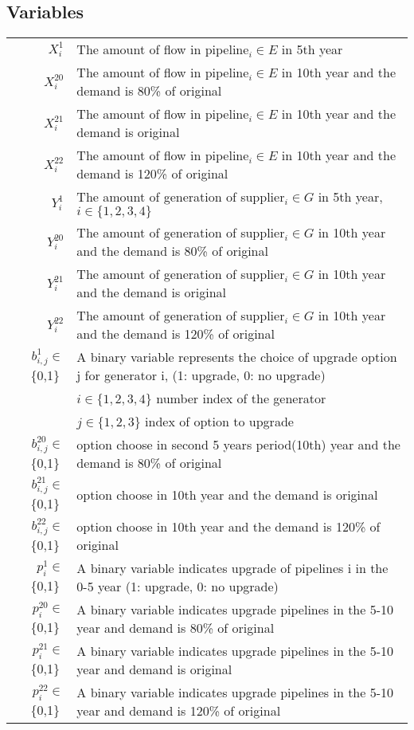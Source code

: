 \documentclass{article}
\begin{document}
	

	\subsection*{Variables}
	
	\begin{tabular}{rl}
		$X^1_{i} $ &  The amount of flow in pipeline$_i\in E$ in 5th year \\
		$X^{20}_{i} $ &  The amount of flow in pipeline$_i\in E$ in 10th year and the demand is 80\% of original\\
		$X^{21}_{i} $ &  The amount of flow in pipeline$_i\in E$ in 10th year and the demand is original\\
		$X^{22}_{i} $ &  The amount of flow in pipeline$_i\in E$ in 10th year and the demand is 120\% of original\\
		$Y^1_{i} $ &  The amount of generation of supplier$_i\in G$ in 5th year, $i\in \{1,2,3,4\}$ \\
		$Y^{20}_{i} $ &  The amount of generation of supplier$_i\in G$ in 10th year and the demand is 80\% of original \\
		$Y^{21}_{i} $ &  The amount of generation of supplier$_i\in G$ in 10th year and the demand is original \\
		$Y^{22}_{i} $ &  The amount of generation of supplier$_i\in G$ in 10th year and the demand is 120\% of original\\
		$b^1_{i,j} \in $ \{0,1\}  $ $ & A binary variable represents the choice of upgrade option j for generator i, (1: upgrade, 0: no upgrade)\\
		&$i\in\{1,2,3,4\}$ number index of the generator\\
		&$j\in\{1,2,3\}$ index of option to upgrade\\
		$b^{20}_{i,j} \in $ \{0,1\}  $ $ & option choose in second 5 years period(10th) year and the demand is 80\% of original\\
		$b^{21}_{i,j} \in $ \{0,1\}  $ $ & option choose in 10th year and the demand is original\\
		$b^{22}_{i,j} \in $ \{0,1\}  $ $ & option choose in 10th year and the demand is 120\% of original\\

		$p^1_i \in $ \{0,1\}  $ $ &  A binary variable indicates upgrade of pipelines i in the 0-5 year (1: upgrade, 0: no upgrade)\\
		$p^{20}_i \in $ \{0,1\}  $ $ &  A binary variable indicates upgrade pipelines in the 5-10 year and demand is 80\% of original \\
		$p^{21}_i \in $ \{0,1\}  $ $ &  A binary variable indicates upgrade pipelines in the 5-10 year and demand is original \\
		$p^{22}_i \in $ \{0,1\}  $ $ &  A binary variable indicates upgrade pipelines in the 5-10 year and demand is 120\% of original\\

	\end{tabular}
	
\end{document}
